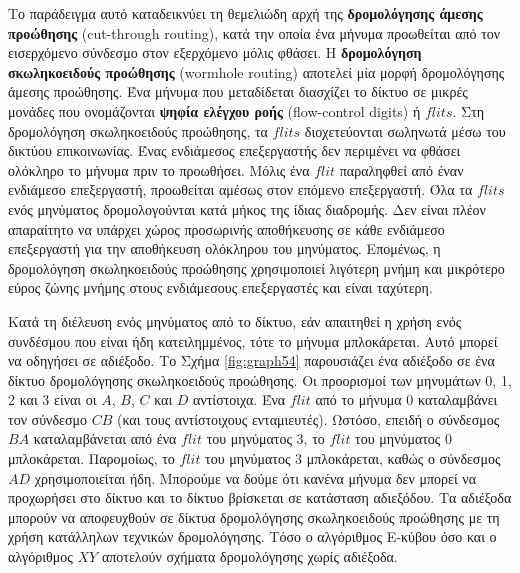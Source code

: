 \documentclass[12pt,a4paper]{article}
\begin{document}
Το παράδειγμα αυτό καταδεικνύει τη θεμελιώδη αρχή της
\textbf{δρομολόγησης άμεσης προώθησης}
(\foreignlanguage{english}{cut-through routing}), κατά την οποία ένα
μήνυμα προωθείται από τον εισερχόμενο σύνδεσμο στον εξερχόμενο μόλις φθάσει.
Η \textbf{δρομολόγηση σκωληκοειδούς προώθησης}
(\foreignlanguage{english}{wormhole routing}) αποτελεί μία μορφή
δρομολόγησης άμεσης προώθησης. Ένα μήνυμα που μεταδίδεται διασχίζει το 
δίκτυο σε μικρές μονάδες που ονομάζονται \textbf{ψηφία ελέγχου ροής}
(\foreignlanguage{english}{flow-control digits}) ή $flits$.
Στη δρομολόγηση σκωληκοειδούς προώθησης, τα $flits$ διοχετεύονται
σωληνωτά μέσω του δικτύου επικοινωνίας. Ένας ενδιάμεσος επεξεργαστής δεν 
περιμένει να φθάσει ολόκληρο το μήνυμα πριν το προωθήσει. Μόλις ένα $flit$ 
παραληφθεί από έναν ενδιάμεσο επεξεργαστή, προωθείται αμέσως στον επόμενο 
επεξεργαστή. Όλα τα $flits$ ενός μηνύματος δρομολογούνται κατά μήκος της 
ίδιας διαδρομής. Δεν είναι πλέον απαραίτητο να υπάρχει χώρος προσωρινής 
αποθήκευσης σε κάθε ενδιάμεσο επεξεργαστή για την αποθήκευση ολόκληρου του 
μηνύματος. Επομένως, η δρομολόγηση σκωληκοειδούς προώθησης χρησιμοποιεί 
λιγότερη μνήμη και μικρότερο εύρος ζώνης μνήμης στους ενδιάμεσους 
επεξεργαστές και είναι ταχύτερη.

Κατά τη διέλευση ενός μηνύματος από το δίκτυο, εάν απαιτηθεί η χρήση ενός
συνδέσμου που είναι ήδη κατειλημμένος, τότε το μήνυμα μπλοκάρεται. Αυτό μπορεί
να οδηγήσει σε αδιέξοδο. Το Σχήμα \ref{fig:graph54} παρουσιάζει ένα
αδιέξοδο σε ένα δίκτυο δρομολόγησης σκωληκοειδούς προώθησης. Οι προορισμοί 
των μηνυμάτων 0, 1, 2 και 3 είναι οι $A$, $B$, $C$ και $D$ αντίστοιχα. 
Ένα $flit$ από το μήνυμα 0 καταλαμβάνει τον σύνδεσμο $CB$ (και τους αντίστοιχους 
ενταμιευτές). Ωστόσο, επειδή ο σύνδεσμος $BA$ καταλαμβάνεται από ένα $flit$ 
του μηνύματος 3, το $flit$ του μηνύματος 0 μπλοκάρεται. Παρομοίως, το 
$flit$ του μηνύματος 3 μπλοκάρεται, καθώς ο σύνδεσμος $AD$ χρησιμοποιείται ήδη. 
Μπορούμε να δούμε ότι κανένα μήνυμα δεν μπορεί να προχωρήσει στο δίκτυο 
και το δίκτυο βρίσκεται σε κατάσταση αδιεξόδου. Τα αδιέξοδα μπορούν να 
αποφευχθούν σε δίκτυα δρομολόγησης σκωληκοειδούς προώθησης με τη χρήση 
κατάλληλων τεχνικών δρομολόγησης. Τόσο ο αλγόριθμος Ε-κύβου όσο και ο 
αλγόριθμος $XY$ αποτελούν σχήματα δρομολόγησης χωρίς αδιέξοδα.
\end{document}

